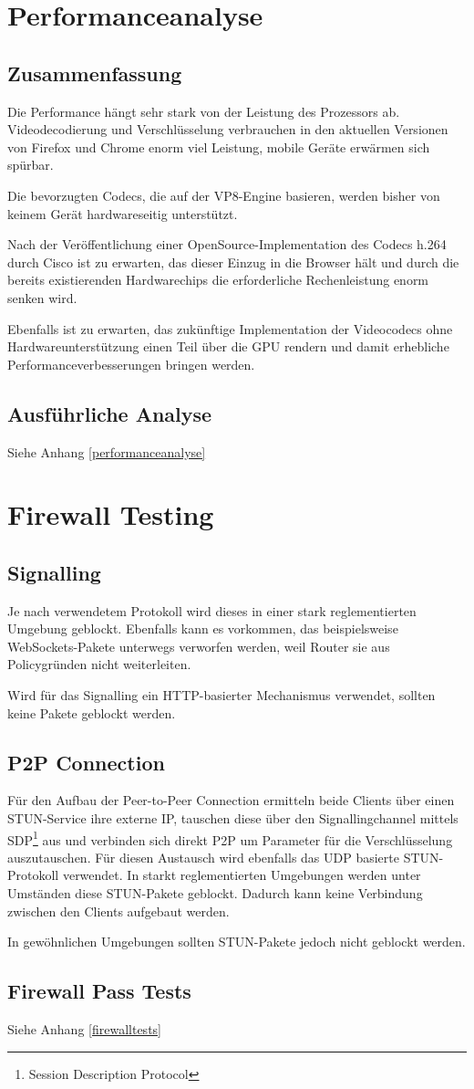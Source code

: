 \chapter{Performanceanalyse}
	\section{Zusammenfassung}
		Die Performance hängt sehr stark von der Leistung des Prozessors ab. Videodecodierung und Verschlüsselung verbrauchen in den aktuellen Versionen von Firefox und Chrome enorm viel Leistung, mobile Geräte erwärmen sich spürbar.
		
		Die bevorzugten Codecs, die auf der VP8-Engine basieren, werden bisher von
		keinem Gerät hardwareseitig unterstützt.
		
		Nach der Veröffentlichung einer OpenSource-Implementation des Codecs h.264
		durch Cisco ist zu erwarten, das dieser Einzug in die Browser hält und durch die bereits existierenden Hardwarechips die erforderliche Rechenleistung enorm senken wird.
		
		Ebenfalls ist zu erwarten, das zukünftige Implementation der Videocodecs ohne Hardwareunterstützung einen Teil über die GPU rendern und damit erhebliche Performanceverbesserungen bringen werden.
		
	\section{Ausführliche Analyse}
		Siehe Anhang \ref{performanceanalyse}
	
	
\chapter{Firewall Testing}
	\section{Signalling}
		Je nach verwendetem Protokoll wird dieses in einer stark reglementierten
		Umgebung geblockt. Ebenfalls kann es vorkommen, das beispielsweise
		WebSockets-Pakete unterwegs verworfen werden, weil Router sie aus
		Policygründen nicht weiterleiten.
		
		Wird für das Signalling ein HTTP-basierter Mechanismus verwendet, sollten
		keine Pakete geblockt werden.

	\section{P2P Connection}
		Für den Aufbau der Peer-to-Peer Connection ermitteln beide Clients über einen
		STUN-Service ihre externe IP, tauschen diese über den Signallingchannel
		mittels SDP\footnote{Session Description Protocol} aus und verbinden sich
		direkt P2P um Parameter für die Verschlüsselung auszutauschen. Für diesen
		Austausch wird ebenfalls das UDP basierte STUN-Protokoll verwendet.
		In starkt reglementierten Umgebungen werden unter Umständen diese STUN-Pakete
		geblockt. Dadurch kann keine Verbindung zwischen den Clients aufgebaut werden.
		
		In gewöhnlichen Umgebungen sollten STUN-Pakete jedoch nicht geblockt werden.
	
	\section{Firewall Pass Tests}
		Siehe Anhang \ref{firewalltests}